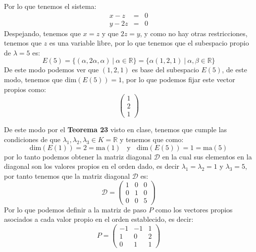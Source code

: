 \begin{itemize}
\begin{itemize}
    Por lo que tenemos el sistema:
    \begin{eqnarray*}
    x-z&=&0\\
    y-2z&=&0
    \end{eqnarray*}
    Despejando, tenemos que $x=z$ y que $2z=y$, y como no hay otras restricciones, tenemos que $z$ es una variable libre, por lo que tenemos que el subespacio propio de $\lambda=5$ es:
    \[E(5)=\{(\alpha,2\alpha,\alpha)~|~\alpha\in\mathbb{R}\}=\{\alpha(1,2,1)~|~\alpha,\beta\in\mathbb{R}\}\]
    De este modo podemos ver que $(1,2,1)$ es base del subespacio $E(5)$, de este modo, tenemos que $\text{dim}(E(5))=1$, por lo que podemos fijar este vector propios como:
    $$\begin{pmatrix}1\\ 2\\ 1\end{pmatrix}$$
    
    \end{itemize}
    De este modo por el \textbf{Teorema 23} visto en clase, tenemos que cumple las condiciones de que $\lambda_1,\lambda_2,\lambda_3\in K=\mathbb{R}$ y tenemos que como:
    \[\text{dim}(E(1))=2=\text{ma}(1)~~~~\text{y}~~~~\text{dim}(E(5))=1=\text{ma}(5)\]
    por lo tanto podemos obtener la matriz diagonal $\mathcal{D}$ en la cual sus elementos en la diagonal son los valores propios en el orden dado, es decir $\lambda_1=\lambda_2=1$ y $\lambda_3=5$, por tanto tenemos que la matriz diagonal $\mathcal{D}$ es:
    $$\mathcal{D}=\begin{pmatrix}1&0&0\\ 0&1&0\\ 0&0&5\end{pmatrix}$$
   Por lo que podemos definir a la matriz de paso $P$ como los vectores propios asociados a cada valor propio en el orden establecido, es decir:
    $$P=\begin{pmatrix}-1&-1&1\\ 1&0&2\\ 0&1&1\end{pmatrix}$$
    

\end{itemize}
